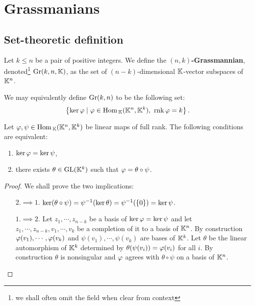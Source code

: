 \chapter{Grassmanians}

\section{Set-theoretic definition}
\begin{definition}[Grassmannian]
Let $k\leq n$ be a pair of positive integers. We define the \textbf{$(n,k)$-Grassmannian}, denoted\footnote{we shall often omit the field when clear from context} $\mathrm{Gr}(k,n,\mathbb{K})$, as the set of $(n-k)$-dimensional $\mathbb{K}$-vector subspaces of $\mathbb{K}^n$.
\end{definition}
\begin{remark}
We may equivalently define $\mathrm{Gr}(k,n)$ to be the following set:
\[\cpa{\ker \vp\mid \vp\in \Hom_\K(\K^n,\K^k),\ \rnk \vp=k}.\]
\end{remark}

\begin{lemma}\label{kerAkerBVSActionOfGLk}
Let $\varphi,\psi\in \mathrm{Hom}\,_{\mathbb{K}}(\mathbb{K}^n,\mathbb{K}^k)$ be linear maps of full rank. The following conditions are equivalent:
\begin{enumerate}
    \item $\ker\varphi=\ker\psi$,
    \item there exists $\theta\in \mathrm{GL}(\mathbb{K}^k)$ such that $\varphi=\theta\circ \psi$. 
\end{enumerate}
\end{lemma}
\begin{proof}
We shall prove the two implications:
\setlength{\leftmargini}{0cm}
\begin{itemize}
\item[$\boxed{2.\implies 1.}$] $\ker(\theta\circ \psi)=\psi^{-1}(\ker \theta)=\psi^{-1}(\left\{{0}\right\})=\ker \psi$. 
\item[$\boxed{1.\implies 2.}$] Let $z_1,\cdots, z_{n-k}$ be a basis of $\ker \varphi=\ker \psi$ and let $z_1,\cdots, z_{n-k}, v_1,\cdots, v_k$ be a completion of it to a basis of $\mathbb{K}^n$. By construction $\varphi(v_1),\cdots, \varphi(v_k)$ and $\psi(v_1),\cdots, \psi(v_k)$ are bases of $\mathbb{K}^k$. Let $\theta$ be the linear automorphism of $\mathbb{K}^k$ determined by $\theta(\psi(v_i))=\varphi(v_i)$ for all $i$. By construction $\theta$ is nonsingular and $\varphi$ agrees with $\theta\circ \psi$ on a basis of $\mathbb{K}^n$.
\end{itemize}
\setlength{\leftmargini}{0.5cm}
\end{proof}


